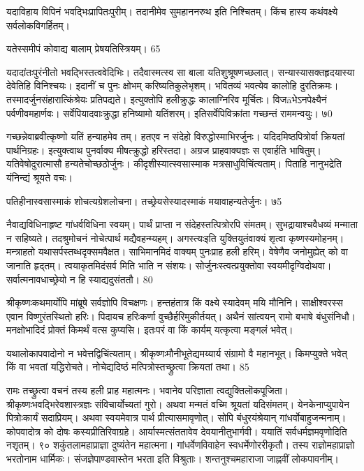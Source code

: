 यदाविहाय विपिनं भवद्भिःप्रापितःपुरीम्।
 तदानीमेव सुमहाननरुथ इति निश्चितम्।
 किंच हास्य कथंवक्ष्ये सर्वलोकविगर्हितम्।
 
यतेस्समीपं कोवाद्य बालाम् प्रेषयतिस्त्रियम्।
65

 यदादांतःपुरंनीतो भवद्भिस्तत्ववेदिभिः।
 तदैवास्मत्स्व सा बाला यतिशुश्रूषणच्छलात्।
 सन्यास्यासक्तहृदयास्या देवेतिहि विनिश्चयः।
 इदानीं च पुनः क्षोभम् करिष्यतिकुलेभृशम्।
 भवितव्यं भवत्येव कालोहि दुरतिक्रमः।
 तस्मादर्जुनसंहारात्किंश्रेयः प्रतिपद्यते।
 इत्युक्तोपि हलीक्रुद्धः कालाग्निरिव मूर्चितः।
 विजāभेऽनपेक्ष्यैनं पर्वणीवमहार्णवः।
 सर्वेपियादवाःक्रुद्धा हनिष्यामो यतिंशरम्।
 इतिसर्वेपिविक्रांता गच्छन्तं राममन्वयुः।
 ७0

  गच्छन्नेवाब्रवीत्कृष्णो यतिं हन्याहमेव तम्।
 हतएव न संदेहो विरुद्धोस्माभिरर्जुनः।
 यदिदमिष्ठपित्रोर्वा क्रियतां पार्थनिग्रहः।
 इत्युक्त्वाथ पुनर्वाक्य मीषत्क्रुद्धो हरिस्तदा।
 अग्रज प्राहवाक्यज्ञः स एवार्हति भाषितुम्।
 यतिवेषोदुरात्मासौ हन्यतेचोच्छठोर्जुनः।
 कीदृशीस्यात्स्वसास्माक मत्रसाधुविचिंत्यताम्।
 पिताहि नानुभद्रेति यंनिन्द्यं श्रूयते वचः।
 
पतिहीनास्वसास्माकं शोचत्यग्रेशलोचना।
 तच्छ्रेयसेस्यादस्माकं मयावाहन्यतेर्जुनः।
 ७5

  नैवाद्यविधिनाहृष्ट गांधर्वविधिना स्वयम्।
 पार्थं प्राप्ता न संदेहस्तत्पित्रोरपि संमतम्।
 सुभद्रायाश्चवैधव्यं मन्माता न सहिष्यते।
 तदश्रुमोचनं नोचेत्पार्थ मद्यैवहन्म्यहम्।
 अगस्त्यःइति युक्तियुतंवाक्यं शृत्वा कृष्णस्यमोहनम्।
 मन्त्राहतो यथासर्पस्तब्धदृक्समवैक्षत।
 साभिमानमिदं वाक्यम् पुनःप्राह हली हरिम्।
 वेषेणैव जनोमुह्येत् को वा जानाति हृद्तम्।
 त्वयाकृतमिदंसर्व मिति भाति न संशयः।
 सोर्जुनःस्त्वत्प्रयुक्तोवा स्वयमीदृग्विदोथवा।
 सर्वात्मनावधाच्छ्रेयो न हि स्याद्यदुसंततौ।
 80

  श्रीकृष्णःकथमार्योपि मांब्रूषे सर्वज्ञोपि विचक्षणः।
 हन्तहंतात्र किं वक्ष्ये स्यादेवम् मयि मौनिनि।
 साक्षीश्वरस्स एवान विष्णुरंतस्थितो हरिः।
 पिदायच हरिःकर्णा वुच्छैर्हरिमुकीर्तयत्।
 अथैनं सांत्वयन् रामो बभाषे बंधुसंनिधौ।
 मनक्षोभादिदं प्रोक्तं किमर्थं वत्स कुप्यसि।
 इतःपरं वा किं कार्यम् यत्कृत्वा मङ्गलं भवेत्।
 
यथालोकापवादोनो न भवेत्तद्विचिंत्यताम्।
 श्रीकृष्णःमौनीभूतेद्यमय्यार्य संग्रामो वै महानभूत्।
 किमप्युक्ते भवेत् किं वा भवतां यद्धिरोचते।
 नोचेद्यदिष्ठं मत्पित्रोस्तच्छ्रुत्वा क्रियतां तथा।
 85

 
रामः
तच्छ्रुत्वा वचनं तस्य हली प्राह महात्मनः।
 भवानेव परिज्ञाता त्वद्युक्तिलॊकपूजिता।
 श्रीकृष्णःभवद्भिरेवशास्त्रज्ञः संविचार्योच्यतां गुरो।
 अथवा मन्मतं वच्मि श्रूयतां यदिसंमतम्।
 येनकेनाप्युपायेन पित्रोःकार्यं सदाप्रियम्।
 अथवा स्वयमेवात्र पार्थ प्रीत्यासमावृणोत्।
 सोपि बंधुरयंश्रेयान् गांधर्वोबाहुजन्मनाम्।
 कोपवादोत्र को दोषः कस्यप्रीतिरिवाग्रहे।
 आर्यास्मत्संततावेव देवयानीतुभार्गवी।
 ययातिं सर्वधर्मज्ञमवृणोदिति नशृतम्।
 ९० शकुंतलामहाप्राज्ञा दुष्यंतेन महात्मना।
 गांधर्वेणविवाहेन स्वधर्मेणोररीकृतौ।
 तस्य राज्ञोमहाप्राज्ञो भरतोनाम धार्मिकः।
 संजज्ञेपाण्डवास्तेन भरता इति विश्रुताः।
 शन्तनुश्चमहाराजा जाह्नवीं लोकपावनीम्।
 
